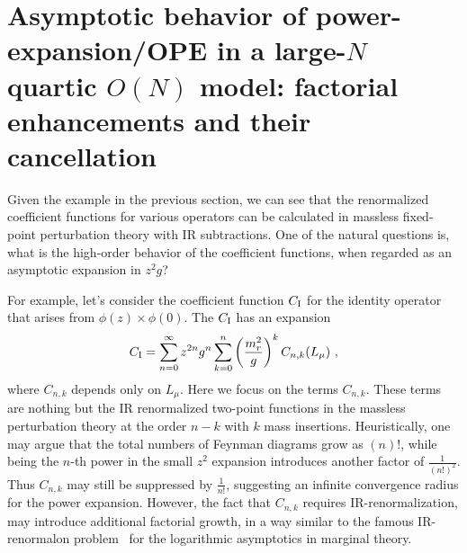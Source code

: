 \documentclass[a4paper,11pt]{article}
\begin{document}
\section{Asymptotic behavior of power-expansion/OPE in a large-$N$ quartic $O(N)$ model: factorial enhancements and their cancellation}\label{sec:OPEdiverge}
Given the example in the previous section, we can see that the renormalized coefficient functions for various operators can be calculated in massless fixed-point perturbation theory with IR subtractions.  One of the natural questions is, what is the high-order behavior of the coefficient functions, when regarded as an asymptotic expansion in $z^2g$? 

For example, let's consider the coefficient function $C_{\rm I}$ for the identity operator that arises from $\phi(z)\times \phi(0)$. The $C_{\rm I}$ has an expansion
\begin{align}
C_{\rm I}=\sum_{n=0}^{\infty}z^{2n}g^n\sum_{k=0}^n \left(\frac{m_r^2}{g}\right)^kC_{n,k}(L_\mu) \ ,
\end{align}
where $C_{n,k}$ depends only on $L_\mu$.  Here we focus on the terms $C_{n,k}$. These terms are nothing but the IR renormalized two-point functions in the massless perturbation theory at the order $n-k$ with $k$ mass insertions. Heuristically,  one may argue that the total numbers of Feynman diagrams grow as $(n)!$, while being the $n$-th power in the small $z^2$ expansion introduces another factor of $\frac{1}{(n!)^2}$. Thus $C_{n,k}$ may still be suppressed by $\frac{1}{n!}$, suggesting an infinite convergence radius for the power expansion. However, the fact that $C_{n,k}$ requires IR-renormalization, may introduce additional factorial growth, in a way similar to the famous IR-renormalon problem~\cite{tHooft:1977xjm,Parisi:1978az,Parisi:1978bj} for the logarithmic asymptotics in marginal theory. 
\end{document}

